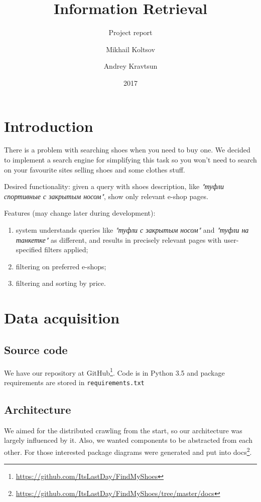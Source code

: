 \documentclass[format=sigconf]{acmart}
\title{Information Retrieval}
\subtitle{Project report}
\author{Mikhail Koltsov}
\author{Andrey Kravtsun}
\date{2017}
\begin{document}
\maketitle

\section{Introduction}
There is a problem with searching shoes when you need to buy one. We decided to implement a search engine for sim\-pli\-fy\-ing this task so you won't need to search on your favourite sites selling shoes and some clothes stuff.

Desired functionality: given a query with shoes description, like \textit{"туфли спортивные с закрытым носом"}, show only re\-le\-vant e-shop pages.

Features (may change later during development):
\begin{enumerate}
    \item system understands queries like \textit{"туфли с закрытым носом"} and \textit{"туфли на танкетке"} as different, and results in precisely relevant pages with user-specified filters applied;
    \item filtering on preferred e-shops;
    \item filtering and sorting by price.
\end{enumerate}

\section{Data acquisition}
\subsection{Source code}
    We have our repository at GitHub\footnote{\url{https://github.com/ItsLastDay/FindMyShoes}}. 
    Code is in Python 3.5 and package requirements are stored in \texttt{requirements.txt}
    
\subsection{Architecture}
    We aimed for the distributed crawling from the start, so our architecture was largely influenced by it. Also, we wanted com\-po\-nents to be abstracted from each other. For those interested package diagrams were generated and put into docs\footnote{\url{https://github.com/ItsLastDay/FindMyShoes/tree/master/docs}}.
    
\end{document}
